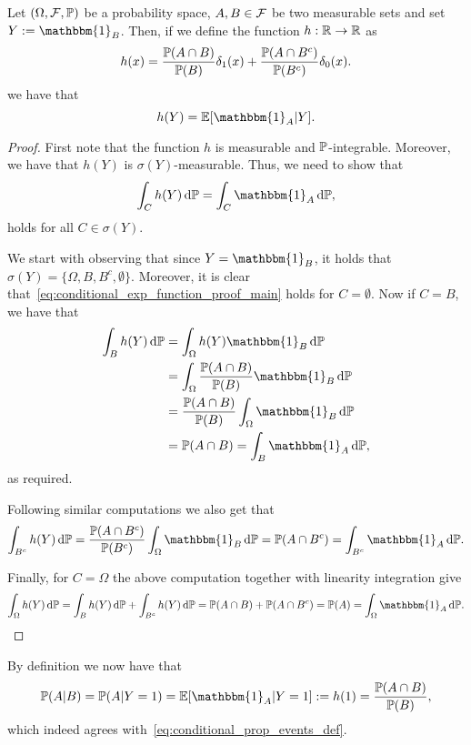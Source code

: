 \begin{lemma}\label{lem:conditional_expectation_function}
Let $(\Omega, \mathcal F, \mathbb P)$ be a probability space, $A, B \in \mathcal F$ be two measurable sets and set $Y := \mathbbm{1}_B$. Then, if we define the function $h : \mathbb R \to \mathbb R$ as
\[
	h(x) = \frac{\mathbb P(A \cap B)}{\mathbb P(B)} \delta_{1}(x) + \frac{\mathbb P(A \cap B^c)}{\mathbb P(B^c)}\delta_{0}(x).
\]
we have that
\[
	h(Y) = \bbE[\mathbbm{1}_A | Y].
\]
\end{lemma}

\begin{proof}
First note that the function $h$ is measurable and $\mathbb P$-integrable. Moreover, we have that $h(Y)$ is $\sigma(Y)$-measurable. Thus, we need to show that
\begin{equation}\label{eq:conditional_exp_function_proof_main}
	\int_C h(Y) \, \dd \bbP = \int_C \mathbbm{1}_A \, \dd \bbP,
\end{equation}
holds for all $C \in \sigma(Y)$.

We start with observing that since $Y = \mathbbm{1}_B$, it holds that $\sigma(Y) = \{\Omega, B, B^c, \emptyset\}$. Moreover, it is clear that~\eqref{eq:conditional_exp_function_proof_main} holds for $C = \emptyset$. Now if $C = B$, we have that
\begin{align*}
	\int_B h(Y) \, \dd \bbP &= \int_\Omega h(Y) \mathbbm{1}_B \, \dd \bbP \\
	&= \int_\Omega \frac{\bbP(A \cap B)}{\bbP(B)} \mathbbm{1}_B \, \dd \bbP \\
	&= \frac{\bbP(A \cap B)}{\bbP(B)} \int_\Omega \mathbbm{1}_B \, \dd \bbP \\
	&= \bbP(A \cap B) = \int_B \mathbbm{1}_A \, \dd \bbP,
\end{align*}
as required.

Following similar computations we also get that
\[
	\int_{B^c} h(Y) \, \dd \bbP = \frac{\bbP(A \cap B^c)}{\bbP(B^c)} \int_\Omega \mathbbm{1}_B \, \dd \bbP
	= \bbP(A \cap B^c) = \int_{B^c} \mathbbm{1}_A \, \dd \bbP.
\]

Finally, for $C = \Omega$ the above computation together with linearity integration give
\[
	\int_\Omega h(Y) \, \dd \bbP = \int_B h(Y) \, \dd \bbP + \int_{B^c} h(Y) \, \dd \bbP
	= \bbP(A \cap B) + \bbP(A \cap B^c) = \bbP(A) = \int_\Omega \mathbbm{1}_A \, \dd \bbP.
\]
\end{proof}

By definition we now have that 
\[
	\bbP(A | B) = \bbP(A | Y = 1) = \bbE[\mathbbm{1}_A | Y = 1] := h(1) = \frac{\bbP(A \cap B)}{\bbP(B)},
\]
which indeed agrees with~\eqref{eq:conditional_prop_events_def}.


